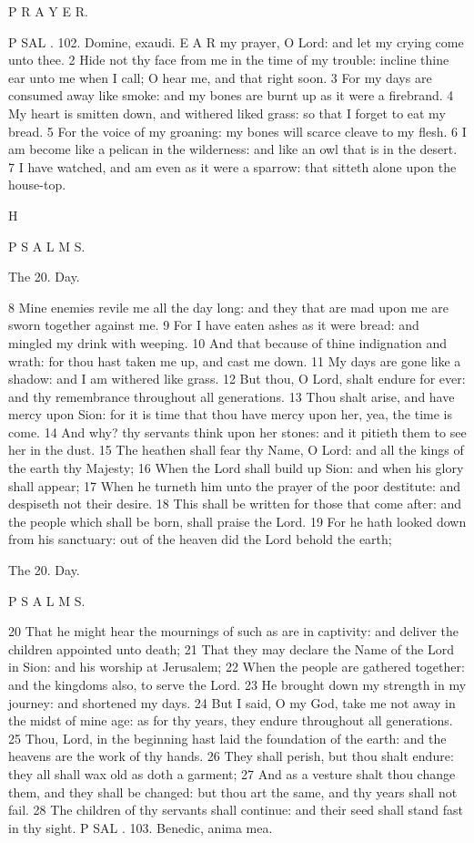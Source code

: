 P R A Y E R.

P SAL . 102. Domine, exaudi. E A R my prayer, O Lord: and let my crying come unto thee. 2 Hide not thy face from me in the time of my trouble: incline thine ear unto me when I call; O hear me, and that right soon. 3 For my days are consumed away like smoke: and my bones are burnt up as it were a firebrand. 4 My heart is smitten down, and withered liked grass: so that I forget to eat my bread. 5 For the voice of my groaning: my bones will scarce cleave to my flesh. 6 I am become like a pelican in the wilderness: and like an owl that is in the desert. 7 I have watched, and am even as it were a sparrow: that sitteth alone upon the house-top.

H

P S A L M S.

The 20. Day.

8 Mine enemies revile me all the day long: and they that are mad upon me are sworn together against me. 9 For I have eaten ashes as it were bread: and mingled my drink with weeping. 10 And that because of thine indignation and wrath: for thou hast taken me up, and cast me down. 11 My days are gone like a shadow: and I am withered like grass. 12 But thou, O Lord, shalt endure for ever: and thy remembrance throughout all generations. 13 Thou shalt arise, and have mercy upon Sion: for it is time that thou have mercy upon her, yea, the time is come. 14 And why? thy servants think upon her stones: and it pitieth them to see her in the dust. 15 The heathen shall fear thy Name, O Lord: and all the kings of the earth thy Majesty; 16 When the Lord shall build up Sion: and when his glory shall appear; 17 When he turneth him unto the prayer of the poor destitute: and despiseth not their desire. 18 This shall be written for those that come after: and the people which shall be born, shall praise the Lord. 19 For he hath looked down from his sanctuary: out of the heaven did the Lord behold the earth;

The 20. Day.

P S A L M S.

20 That he might hear the mournings of such as are in captivity: and deliver the children appointed unto death; 21 That they may declare the Name of the Lord in Sion: and his worship at Jerusalem; 22 When the people are gathered together: and the kingdoms also, to serve the Lord. 23 He brought down my strength in my journey: and shortened my days. 24 But I said, O my God, take me not away in the midst of mine age: as for thy years, they endure throughout all generations. 25 Thou, Lord, in the beginning hast laid the foundation of the earth: and the heavens are the work of thy hands. 26 They shall perish, but thou shalt endure: they all shall wax old as doth a garment; 27 And as a vesture shalt thou change them, and they shall be changed: but thou art the same, and thy years shall not fail. 28 The children of thy servants shall continue: and their seed shall stand fast in thy sight. P SAL . 103. Benedic, anima mea.

